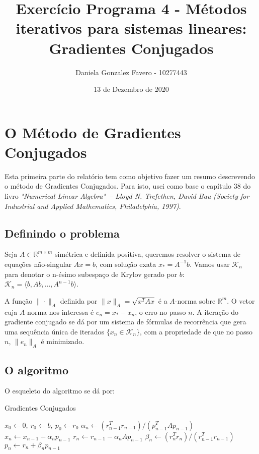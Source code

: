 \documentclass[a4paper,11pt]{article}
\title{Exercício Programa 4 - Métodos iterativos para sistemas lineares: Gradientes Conjugados}
\author{
  Daniela Gonzalez Favero - 10277443
}
\date{13 de Dezembro de 2020}
\begin{document}
    \maketitle
    
    \section{O Método de Gradientes Conjugados}
        Esta primeira parte do relatório tem como objetivo fazer um resumo descrevendo o método de Gradientes Conjugados. Para isto, usei como base o capítulo 38 do livro \textit{"Numerical Linear Algebra"\ – Lloyd N. Trefethen, David Bau (Society for Industrial and Applied Mathematics, Philadelphia, 1997)}.
    
        \subsection{Definindo o problema}
            Seja $A \in \mathbb{R}^{m \times m}$ simétrica e definida positiva, queremos resolver o sistema de equações não-singular $Ax=b$, com solução exata $x_* = A^{-1}b$. Vamos usar $\mathcal{K}_n$ para denotar o n-ésimo subespaço de Krylov gerado por $b$: $\mathcal{K}_n = \langle b,Ab, \dots , A^{n-1}b \rangle$.
            
            A função $\| \cdot \|_A$ definida por $\| x \|_A = \sqrt{x^TAx}$ é a $A$-norma sobre $\mathbb{R}^{m}$. O vetor cuja $A$-norma nos interessa é $e_n=x_*-x_n$, o erro no passo $n$. A iteração do gradiente conjugado se dá por um sistema de fórmulas de recorrência que gera uma sequência única de iterados $\{ x_n \in \mathcal{K}_n \}$, com a propriedade de que no passo $n$, $\| e_n \|_A$ é minimizado.
        \subsection{O algoritmo}
            O esqueleto do algoritmo se dá por:
            \begin{algorithm}
                \renewcommand\thealgorithm{}
                \caption{Gradientes Conjugados}
                \begin{algorithmic} 
                    \STATE $x_0 \leftarrow 0,\ r_0 \leftarrow b,\ p_0 \leftarrow r_0$
                        \STATE $\alpha_n \leftarrow (r^T_{n-1}r_{n-1})/(p^T_{n-1}Ap_{n-1})$
                        \STATE $x_n \leftarrow x_{n-1} + \alpha_np_{n-1}$
                        \STATE $r_n \leftarrow r_{n-1} - \alpha_nAp_{n-1}$
                        \STATE $\beta_n \leftarrow (r^T_nr_n)/(r^T_{n-1}r_{n-1})$
                        \STATE $p_n \leftarrow r_n + \beta_np_{n-1}$
                    \ENDFOR
                \end{algorithmic}
            \end{algorithm}
            
\end{document}
